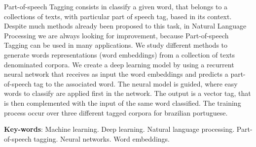 \begin{resumo}[Abstract]
 
Part-of-speech Tagging consists in classify a given word, that belongs to a collections of texts, with particular part of speech tag, based in its context. Despite much methods already been proposed to this task, in Natural Language Processing we are always looking for improvement, because Part-of-speech Tagging can be used in many applications. We study different methods to generate words representations (word embeddings) from a collection of texts denominated corpora. We create a deep learning model by using a recurrent neural network that receives as input the word embeddings and predicts a part-of-speech tag to the associated word. The neural model is guided, where easy words to classify are applied first in the network. The output is a vector tag, that is then complemented with the input of the same word classified. The training process occur over three different tagged corpora for brazilian portuguese.

 \vspace{\onelineskip}
 
 \noindent 
 \textbf{Key-words}: Machine learning. Deep learning. Natural language processing. Part-of-speech tagging. Neural networks. Word embeddings.
\end{resumo}
